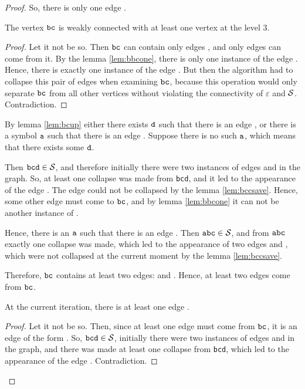 \begin{proof}
So, there is only one edge .

\begin{lemma}
\label{lem:bcup}
The vertex $ {\tt bc} $ is weakly connected with at least one vertex at the level $ 3 $.
\end{lemma}
\begin{proof}
Let it not be so. Then $ {\tt bc} $ can contain only edges , and only edges  can come from it. By the lemma \ref{lem:bbcone}, there is only one instance of the edge . Hence, there is exactly one instance of the edge . But then the algorithm had to collapse this pair of edges when examining $ {\tt bc} $, because this operation would only separate $ {\tt bc} $ from all other vertices without violating the connectivity of $ \varepsilon $ and $ {\cal S} $. Contradiction.
\end{proof}

By lemma \ref{lem:bcup} either there exists $ {\tt d} $ such that there is an edge , or there is a symbol $ {\tt a} $ such that there is an edge . Suppose there is no such $ {\tt a} $, which means that there exists some $ {\tt d} $.

Then $ {\tt bcd} \in {\cal S} $, and therefore initially there were two instances of edges  and  in the graph. So, at least one collapse was made from {\tt bcd}, and it led to the appearance of the edge . The edge  could not be collapsed by the lemma \ref{lem:bccsave}. Hence, some other edge must come to $ {\tt bc} $, and by lemma \ref{lem:bbcone} it can not be another instance of .

Hence, there is an $ {\tt a} $ such that there is an edge . Then $ {\tt abc} \in {\cal S} $, and from $ {\tt abc} $ exactly one collapse was made, which led to the appearance of two edges  and , which were not collapsed at the current moment by the lemma \ref{lem:bccsave}.

Therefore, $ {\tt bc} $ contains at least two edges:  and . Hence, at least two edges come from $ {\tt bc} $.

\begin{lemma}
\label{lem:bccexist}
At the current iteration, there is at least one edge .
\end{lemma}
\begin{proof}
Let it not be so. Then, since at least one edge must come from $ {\tt bc} $, it is an edge of the form . So, $ {\tt bcd} \in {\cal S} $, initially there were two instances of edges  and  in the graph, and there was made at least one collapse from {\tt bcd}, which led to the appearance of the edge . Contradiction.
\end{proof}


\end{proof}
